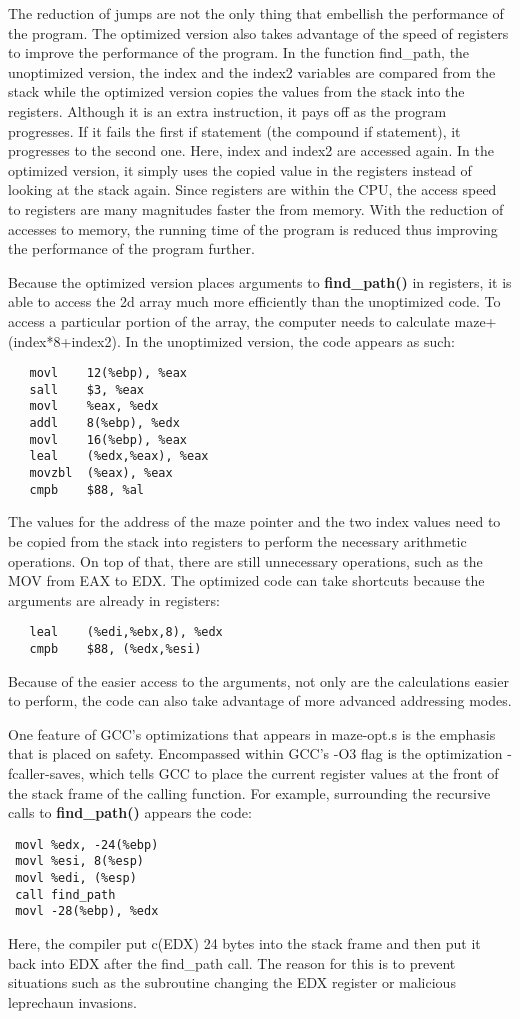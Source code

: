 \documentclass[12pt,letterpaper]{article}
\begin{document}
The reduction of jumps are not the only thing that embellish the performance of the program.  The optimized version also takes advantage of the speed of registers     to improve the performance of the program.  In the function find\_path, the unoptimized version, the index and the index2 variables are compared from the stack while the optimized version copies the values from the stack into the registers.  Although it is an extra instruction, it pays off as the program progresses.  If it fails the first if statement (the compound if statement), it progresses to the second one.  Here, index and index2 are accessed again.  In the optimized version, it simply uses the copied value in the registers instead of looking at the stack again.  Since registers are within the CPU, the access speed to registers are many magnitudes faster the from memory.  With the reduction of accesses to memory, the running time of the program is reduced thus improving the performance of the program further.

Because the optimized version places arguments to {\bf find\_path()} in registers, it is able to access the 2d array much more efficiently than the unoptimized code. To access a particular portion of the array, the computer needs to calculate maze+(index*8+index2). In the unoptimized version, the code appears as such:
\begin{verbatim}
   movl    12(%ebp), %eax
   sall    $3, %eax
   movl    %eax, %edx
   addl    8(%ebp), %edx
   movl    16(%ebp), %eax
   leal    (%edx,%eax), %eax
   movzbl  (%eax), %eax
   cmpb    $88, %al
\end{verbatim}
The values for the address of the maze pointer and the two index values need to be copied from the stack into registers to perform the necessary arithmetic operations. On top of that, there are still unnecessary operations, such as the MOV from EAX to EDX. The optimized code can take shortcuts because the arguments are already in registers:
\begin{verbatim}
   leal    (%edi,%ebx,8), %edx
   cmpb    $88, (%edx,%esi)
\end{verbatim}
Because of the easier access to the arguments, not only are the calculations easier to perform, the code can also take advantage of more advanced addressing modes.

One feature of GCC's optimizations that appears in maze-opt.s is the emphasis that is placed on safety. Encompassed within GCC's -O3 flag is the optimization -fcaller-saves, which tells GCC to place the current register values at the front of the stack frame of the calling function. For example, surrounding the recursive calls to {\bf find\_path()} appears the code:
\begin{verbatim}
 movl %edx, -24(%ebp)
 movl %esi, 8(%esp)
 movl %edi, (%esp)
 call find_path
 movl -28(%ebp), %edx
\end{verbatim}
Here, the compiler put c(EDX) 24 bytes into the stack frame and then put it back into EDX after the find\_path call. The reason for this is to prevent situations such as the subroutine changing the EDX register or malicious leprechaun invasions.
\end{document}
